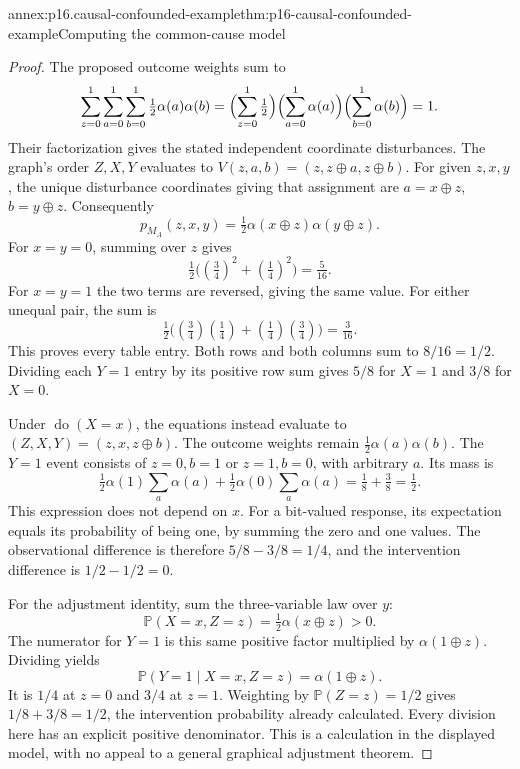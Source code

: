 \begin{annexitem}{annex:p16.causal-confounded-example}{thm:p16-causal-confounded-example}{Computing the common-cause model}
\begin{proof}
The proposed outcome weights sum to
\[
 \sum_{z=0}^1\sum_{a=0}^1\sum_{b=0}^1
          \tfrac12\alpha(a)\alpha(b)
 =\Bigl(\sum_{z=0}^1\tfrac12\Bigr)
    \Bigl(\sum_{a=0}^1\alpha(a)\Bigr)
    \Bigl(\sum_{b=0}^1\alpha(b)\Bigr)=1.
\]
Their factorization gives the stated independent coordinate disturbances.
The graph's order \(Z,X,Y\) evaluates to
\(V(z,a,b)=(z,z\oplus a,z\oplus b)\).
For given \(z,x,y\), the unique disturbance coordinates giving
that assignment are \(a=x\oplus z\), \(b=y\oplus z\).
Consequently
\[
 p_{M_A}(z,x,y)=\tfrac12\alpha(x\oplus z)\alpha(y\oplus z).
\]
For \(x=y=0\), summing over \(z\) gives
\[
 \tfrac12\bigl((\tfrac34)^2+(\tfrac14)^2\bigr)=\tfrac5{16}.
\]
For \(x=y=1\) the two terms are reversed, giving the same value.
For either unequal pair, the sum is
\[
 \tfrac12\bigl((\tfrac34)(\tfrac14)
                    +(\tfrac14)(\tfrac34)\bigr)=\tfrac3{16}.
\]
This proves every table entry. Both rows and both columns sum to
\(8/16=1/2\). Dividing each \(Y=1\) entry by its positive row
sum gives \(5/8\) for \(X=1\) and \(3/8\) for \(X=0\).

Under \(\operatorname{do}(X=x)\), the equations instead evaluate
to \((Z,X,Y)=(z,x,z\oplus b)\). The outcome weights remain
\(\tfrac12\alpha(a)\alpha(b)\). The \(Y=1\) event consists
of \(z=0,b=1\) or \(z=1,b=0\), with arbitrary \(a\).
Its mass is
\[
 \tfrac12\alpha(1)\sum_a\alpha(a)
 +\tfrac12\alpha(0)\sum_a\alpha(a)
 =\tfrac18+\tfrac38=\tfrac12.
\]
This expression does not depend on \(x\). For a bit-valued response,
its expectation equals its probability of being one, by summing the
zero and one values. The observational difference is therefore
\(5/8-3/8=1/4\), and the intervention difference is
\(1/2-1/2=0\).

For the adjustment identity, sum the three-variable law over \(y\):
\[
 \mathbb P(X=x,Z=z)=\tfrac12\alpha(x\oplus z)>0.
\]
The numerator for \(Y=1\) is this same positive factor multiplied
by \(\alpha(1\oplus z)\). Dividing yields
\[
 \mathbb P(Y=1\mid X=x,Z=z)=\alpha(1\oplus z).
\]
It is \(1/4\) at \(z=0\) and \(3/4\) at \(z=1\).
Weighting by \(\mathbb P(Z=z)=1/2\) gives
\(1/8+3/8=1/2\), the intervention probability already calculated.
Every division here has an explicit positive denominator. This is a
calculation in the displayed model, with no appeal to a general graphical
adjustment theorem.
\end{proof}
\end{annexitem}

